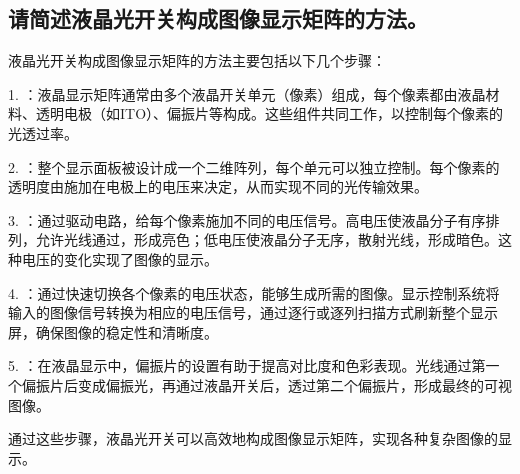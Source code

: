 \documentclass[signature=data]{physicsreport}
\begin{document}
\subsection{请简述液晶光开关构成图像显示矩阵的方法。}

液晶光开关构成图像显示矩阵的方法主要包括以下几个步骤：

1. ：液晶显示矩阵通常由多个液晶开关单元（像素）组成，每个像素都由液晶材料、透明电极（如ITO）、偏振片等构成。这些组件共同工作，以控制每个像素的光透过率。

2. ：整个显示面板被设计成一个二维阵列，每个单元可以独立控制。每个像素的透明度由施加在电极上的电压来决定，从而实现不同的光传输效果。

3. ：通过驱动电路，给每个像素施加不同的电压信号。高电压使液晶分子有序排列，允许光线通过，形成亮色；低电压使液晶分子无序，散射光线，形成暗色。这种电压的变化实现了图像的显示。

4. ：通过快速切换各个像素的电压状态，能够生成所需的图像。显示控制系统将输入的图像信号转换为相应的电压信号，通过逐行或逐列扫描方式刷新整个显示屏，确保图像的稳定性和清晰度。

5. ：在液晶显示中，偏振片的设置有助于提高对比度和色彩表现。光线通过第一个偏振片后变成偏振光，再通过液晶开关后，透过第二个偏振片，形成最终的可视图像。

通过这些步骤，液晶光开关可以高效地构成图像显示矩阵，实现各种复杂图像的显示。
\end{document}
